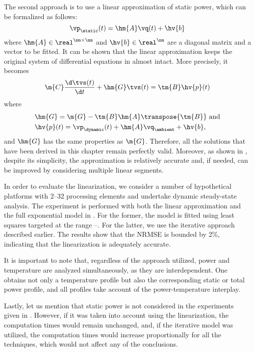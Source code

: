 The second approach is to use a linear approximation of static power, which can
be formalized as follows:
\[
  \vp_\static(t) = \hm{A} \vq(t) + \hv{b}
\]
where $\hm{A} \in \real^{\nn \times \nn}$ and $\hv{b} \in \real^\nn$ are a
diagonal matrix and a vector to be fitted. It can be shown that the linear
approximation keeps the original system of differential equations in
 almost intact. More precisely, it
becomes
\[
  \m{C} \frac{\d \tvs(t)}{\d t} + \hm{G} \tvs(t) = \tm{B} \hv{p}(t)
\]
where
\begin{align*}
  & \hm{G} = \m{G} - \tm{B} \hm{A} \transpose{\tm{B}} \text{ and} \\
  & \hv{p}(t) = \vp_\dynamic(t) + \hm{A} \vq_\ambient + \hv{b},
\end{align*}
and $\hm{G}$ has the same properties as $\m{G}$. Therefore, all the solutions
that have been derived in this chapter remain perfectly valid. Moreover, as
shown in \cite{liu2007}, despite its simplicity, the approximation is relatively
accurate and, if needed, can be improved by considering multiple linear
segments.

In order to evaluate the linearization, we consider a number of hypothetical
platforms with 2--32 processing elements and undertake dynamic steady-state
analysis. The experiment is performed with both the linear approximation and the
full exponential model in . For the former, the model is
fitted using least squares \cite{press2007} targeted at the range
--. For the latter, we use the iterative approach
described earlier. The results show that the \ac{NRMSE} is bounded by 2\%,
indicating that the linearization is adequately accurate.

It is important to note that, regardless of the approach utilized, power and
temperature are analyzed simultaneously, as they are interdependent. One obtains
not only a temperature profile but also the corresponding static or total power
profile, and all profiles take account of the power-temperature interplay.

Lastly, let us mention that static power is not considered in the experiments
given in . However, if it was taken into account
using the linearization, the computation times would remain unchanged, and, if
the iterative model was utilized, the computation times would increase
proportionally for all the techniques, which would not affect any of the
conclusions.
